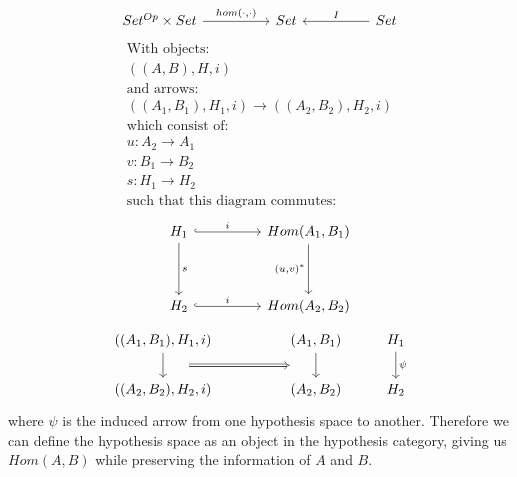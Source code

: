 \documentclass{article}
\theoremstyle{definition}
\begin{document}
\[\begin{tikzcd}
	{Set^{Op} \times Set} && Set && Set
	\arrow["{hom(\cdot, \cdot)}", from=1-1, to=1-3]
	\arrow["I"', from=1-5, to=1-3]
\end{tikzcd}\]
\begin{gather*}
    \text{With objects: } \\
    ((A,B), H, i) \\
    \text{and arrows: }  \\
	{((A_1,B_1), H_1, i)} \rightarrow  {((A_2,B_2), H_2, i)} \\
    \text{which consist of: }  \\
    u: A_2 \rightarrow A_1 \\
    v: B_1 \rightarrow B_2 \\
    s: H_1 \rightarrow H_2 \\
    \text{such that this diagram commutes: }
\end{gather*}
\[\begin{tikzcd}
	{H_1} && {Hom(A_1,B_1)} \\
	\\
	{H_2} && {Hom(A_2,B_2)}
	\arrow["s", from=1-1, to=3-1]
	\arrow["i", hook, from=1-1, to=1-3]
	\arrow["i", hook, from=3-1, to=3-3]
	\arrow["{(u, v)^*}"', from=1-3, to=3-3]
\end{tikzcd}\]
\[\begin{tikzcd}
	{((A_1,B_1), H_1, i)} && {(A_1, B_1)} & {H_1} \\
	{((A_2,B_2),H_2, i)} && {(A_2,B_2)} & {H_2}
	\arrow[""{name=0, anchor=center, inner sep=0}, from=1-1, to=2-1]
	\arrow[""{name=1, anchor=center, inner sep=0}, from=1-3, to=2-3]
	\arrow["\psi", from=1-4, to=2-4]
	\arrow[shorten <=18pt, shorten >=18pt, Rightarrow, from=0, to=1]
\end{tikzcd}\]
where $\psi$ is the induced arrow from one hypothesis space to another. Therefore we can define the hypothesis space as an object in the hypothesis category, giving us $Hom(A,B)$ while preserving the information of $A$ and $B$.
\end{document}
